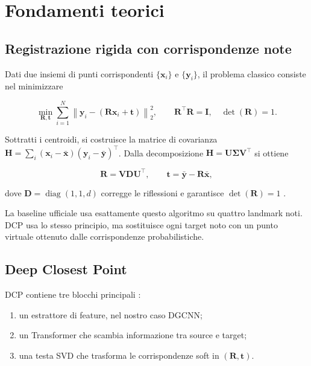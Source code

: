 \documentclass[11pt,a4paper]{article}
\newcommand{\R}{\mathbf{R}}
\newcommand{\tvec}{\mathbf{t}}
\newcommand{\x}{\mathbf{x}}
\newcommand{\y}{\mathbf{y}}
\begin{document}
\section{Fondamenti teorici}

\subsection{Registrazione rigida con corrispondenze note}

Dati due insiemi di punti corrispondenti $\{\x_i\}$ e $\{\y_i\}$, il problema
classico consiste nel minimizzare

\begin{equation}
    \min_{\R,\tvec}
    \sum_{i=1}^{N}\left\|\y_i-(\R\x_i+\tvec)\right\|_2^2,
    \qquad \R^\top\R=\mathbf{I},\quad \det(\R)=1.
\end{equation}

Sottratti i centroidi, si costruisce la matrice di covarianza
$\mathbf{H}=\sum_i(\x_i-\bar{\x})(\y_i-\bar{\y})^\top$. Dalla decomposizione
$\mathbf{H}=\mathbf{U}\mathbf{\Sigma}\mathbf{V}^\top$ si ottiene

\begin{equation}
    \R=\mathbf{V}\mathbf{D}\mathbf{U}^\top,
    \qquad
    \tvec=\bar{\y}-\R\bar{\x},
\end{equation}

dove $\mathbf{D}=\operatorname{diag}(1,1,d)$ corregge le riflessioni e
garantisce $\det(\R)=1$ \cite{arun1987}.

La baseline ufficiale usa esattamente questo algoritmo su quattro landmark
noti. DCP usa lo stesso principio, ma sostituisce ogni target noto con un punto
virtuale ottenuto dalle corrispondenze probabilistiche.

\subsection{Deep Closest Point}

DCP contiene tre blocchi principali \cite{wang2019dcp}:

\begin{enumerate}
    \item un estrattore di feature, nel nostro caso DGCNN;
    \item un Transformer che scambia informazione tra source e target;
    \item una testa SVD che trasforma le corrispondenze soft in $(\R,\tvec)$.
\end{enumerate}
\end{document}
